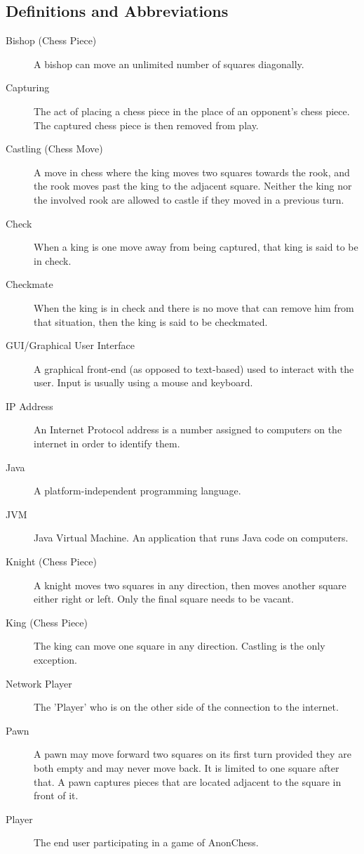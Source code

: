 \subsection{Definitions and Abbreviations}
\begin{description}                                      
\item[Bishop (Chess Piece)] A bishop can move an unlimited number of squares diagonally.
\item[Capturing] The act of placing a chess piece in the place of an opponent's chess piece. The captured chess piece is then removed from play.
\item[Castling (Chess Move)] A move in chess where the king moves two squares towards the rook, and the rook moves past the king to the adjacent square. Neither the king nor the involved rook are allowed to castle if they moved in a previous turn.
\item[Check] When a king is one move away from being captured, that king is said to be in check. 
\item[Checkmate] When the king is in check and there is no move that can remove him from that situation, then the king is said to be checkmated.
\item[GUI/Graphical User Interface] A graphical front-end (as opposed to text-based) used to interact with the user. Input is usually using a mouse and keyboard. 
\item[IP Address ] An Internet Protocol address is a number assigned to computers on the internet in order to identify them.
\item[Java] A platform-independent programming language.
\item[JVM] Java Virtual Machine. An application that runs Java code on computers. 
\item[Knight (Chess Piece)] A knight moves two squares in any direction, then moves another square either right or left. Only the final square needs to be vacant.
\item[King (Chess Piece)] The king can move one square in any direction. Castling is the only exception.
\item[Network Player]  The 'Player' who is on the other side of the connection to the internet.
\item[Pawn]  A pawn may move forward two squares on its first turn provided they are both empty and may never move back. It is limited to one square after that. A pawn captures pieces that are located adjacent to the square in front of it. 
\item[Player] The end user participating in a game of AnonChess. 

\end{description}
